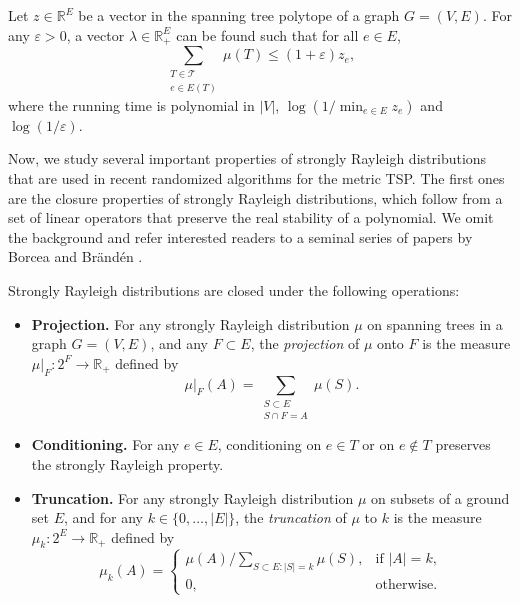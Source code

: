 \documentclass[letterpaper, reqno,12pt]{article}
\newcommand{\RR}{\mathbb{R}}
\begin{document}
\begin{theorem} \label{thm:max-entropy}
  Let $z \in \RR^E$ be a vector in the spanning tree polytope of a graph $G = (V, E)$. For any $\varepsilon > 0$, a vector $\lambda \in \RR_+^E$ can be found such that for all $e \in E$,
  $$ \sum_{\substack{T \in \mathcal T \\ e \in E(T)}} \mu(T) \leq (1 + \varepsilon) z_e, $$
  where the running time is polynomial in $|V|$, $\log (1/\min_{e \in E} z_e)$ and $\log (1/\varepsilon)$.
\end{theorem}

Now, we study several important properties of strongly Rayleigh distributions that are used in recent randomized algorithms for the metric TSP. The first ones are the closure properties of strongly Rayleigh distributions, which follow from a set of linear operators that preserve the real stability of a polynomial. We omit the background and refer interested readers to a seminal series of papers by Borcea and Br\"and\'en \cite{borcea2009lee,borcea2009lee2,borcea2010multivariate}.

\begin{theorem} \label{thm:closure}
  Strongly Rayleigh distributions are closed under the following operations:
  \begin{itemize}[itemsep=0pt, topsep=5pt]
    \item {\bf Projection.} For any strongly Rayleigh distribution $\mu$ on spanning trees in a graph $G = (V, E)$, and any $F \subset E$, the \emph{projection} of $\mu$ onto $F$ is the measure $\mu|_F : 2^F \to \RR_+$ defined by
    $$ \mu|_F(A) = \sum_{\substack{S \subset E \\ S \cap F = A}} \mu(S). $$
    \item {\bf Conditioning.} For any $e \in E$, conditioning on $e \in T$ or on $e \not \in T$ preserves the strongly Rayleigh property.
    \item {\bf Truncation.} For any strongly Rayleigh distribution $\mu$ on subsets of a ground set $E$, and for any $k \in \{ 0, \ldots, |E| \}$, the \emph{truncation} of $\mu$ to $k$ is the measure $\mu_k: 2^E \to \RR_+$ defined by
    $$ \mu_k(A) = \left\{
      \begin{array}{ll}
        \mu(A)/\sum_{S \subset E : |S| = k} \mu(S), & \text{if $|A| = k$}, \\
        0, & \text{otherwise}.
      \end{array}
    \right. $$
  \end{itemize}
\end{theorem}
\end{document}
